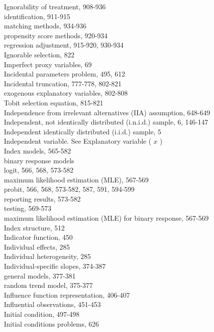 \documentclass[10pt]{article}
\begin{document}
Ignorability of treatment, 908-936\\
identification, 911-915\\
matching methods, 934-936\\
propensity score methods, 920-934\\
regression adjustment, 915-920, 930-934\\
Ignorable selection, 822\\
Imperfect proxy variables, 69\\
Incidental parameters problem, 495, 612\\
Incidental truncation, 777-778, 802-821\\
exogenous explanatory variables, 802-808\\
Tobit selection equation, 815-821\\
Independence from irrelevant alternatives (IIA) assumption, 648-649\\
Independent, not identically distributed (i.n.i.d.) sample, 6, 146-147\\
Independent identically distributed (i.i.d.) sample, 5\\
Independent variable. See Explanatory variable ( $x$ )\\
Index models, 565-582\\
binary response models\\
logit, 566, 568, 573-582\\
maximum likelihood estimation (MLE), 567-569\\
probit, 566, 568, 573-582, 587, 591, 594-599\\
reporting results, 573-582\\
testing, 569-573\\
maximum likelihood estimation (MLE) for binary response, 567-569\\
Index structure, 512\\
Indicator function, 450\\
Individual effects, 285\\
Individual heterogeneity, 285\\
Individual-specific slopes, 374-387\\
general models, 377-381\\
random trend model, 375-377\\
Influence function representation, 406-407\\
Influential observations, 451-453\\
Initial condition, 497-498\\
Initial conditions problems, 626\\
\end{document}
